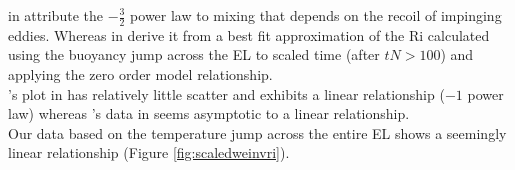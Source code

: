 \citeauthor{Turner86} in \cite{Turner86} attribute the $-\frac{3}{2}$ power law to mixing that depends on the recoil of impinging eddies.  Whereas \citeauthor{FedConzMir04} in \cite{FedConzMir04} derive it from a best fit approximation of the \acs{Ri} calculated using the buoyancy jump across the \acs{EL} to scaled time (after $tN>100$) and applying the zero order model relationship.\\

\citeauthor{BrooksFowler2}'s plot in \cite{BrooksFowler2} has relatively little scatter and exhibits a linear relationship ($-1$ power law) whereas \citeauthor{GarciaMellado}'s data in \cite{GarciaMellado} seems asymptotic to a linear relationship.\\

Our data based on the temperature jump across the entire \acs{EL} shows a seemingly linear relationship (Figure \ref{fig:scaledweinvri}). 



\endinput

Any text after an \endinput is ignored.
You could put scraps here or things in progress.
